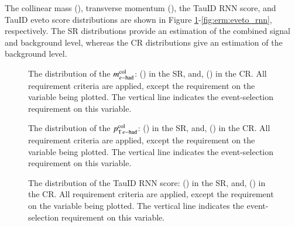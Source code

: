    The \teth collinear mass (\mcolEtau), transverse momentum (\ptcolEtau), the \tauhaderm TauID RNN score, 
    and TauID eveto score distributions are shown in Figure \ref{fig:erm:m_col}-\ref{fig:erm:eveto_rnn}, respectively. 
    The SR distributions provide an estimation of the combined signal and background level, 
    whereas the CR distributions give an estimation of the background level.
        \begin{figure}[!tb]
            \centering
            \caption{
                The distribution of the $m_{e\mathrm{-}\mathrm{had}}^\mathrm{col}$: (\protect{}) in the SR, and,
                (\protect{}) in the CR. 
                All requirement criteria are applied, 
                except the requirement on the variable being plotted.
                The vertical line indicates the event-selection requirement on this variable.
            }
            \label{fig:erm:m_col}
        \end{figure}
        \begin{figure}[!tb]
            \centering
            \caption{
                The distribution of the $p_{\mathrm{T}\,e\mathrm{-}\mathrm{had}}^\mathrm{col}$: (\protect{}) in the SR, and,
                (\protect{}) in the CR. 
                All requirement criteria are applied, 
                except the requirement on the variable being plotted.
                The vertical line indicates the event-selection requirement on this variable.
            }
            \label{fig:erm:ptcol}
        \end{figure}
        \begin{figure}[!tb]
            \centering
            \caption{
                The distribution of the TauID RNN score: (\protect{}) in the SR, and,
                (\protect{}) in the CR. 
                All requirement criteria are applied, 
                except the requirement on the variable being plotted.
                The vertical line indicates the event-selection requirement on this variable.
            }
            \label{fig:erm:rnn}
        \end{figure}
